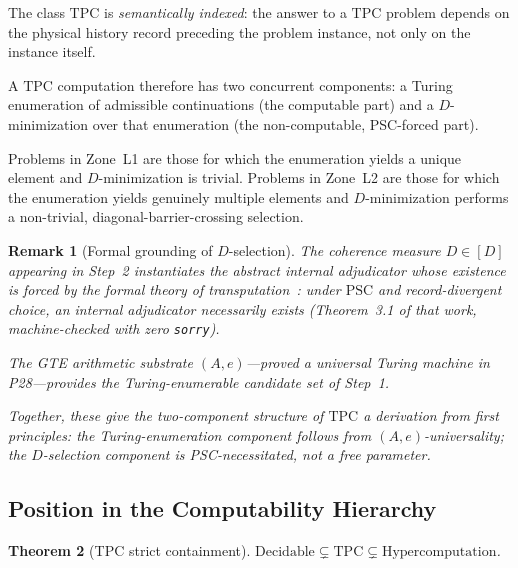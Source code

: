 \documentclass[12pt,letterpaper]{article}
\newtheorem{theorem}{Theorem}[section]
\newtheorem{remark}[theorem]{Remark}
\newcommand{\Dclass}{[D]}
\newcommand{\TPC}{\mathrm{TPC}}
\begin{document}
The class $\TPC$ is \emph{semantically indexed}: the answer to a $\TPC$ problem
depends on the physical history record preceding the problem instance, not only on
the instance itself.

A $\TPC$ computation therefore has two concurrent components: a Turing enumeration of
admissible continuations (the computable part) and a $D$-minimization over that
enumeration (the non-computable, PSC-forced part).

Problems in Zone~L1 are those for which the enumeration yields a unique element and
$D$-minimization is trivial.  Problems in Zone~L2 are those for which the enumeration
yields genuinely multiple elements and $D$-minimization performs a non-trivial,
diagonal-barrier-crossing selection.

\begin{remark}[Formal grounding of $D$-selection]
\label{rem:D-selection-grounding}
The coherence measure $D \in \Dclass$ appearing in Step~2 instantiates the abstract
internal adjudicator whose existence is forced by the formal theory of
transputation~\cite{SpivackNEMS76}: under $\mathrm{PSC}$ and record-divergent choice,
an internal adjudicator necessarily exists (Theorem~3.1 of that work, machine-checked
with zero \texttt{sorry}).

The GTE arithmetic substrate $(A, e)$---proved a universal Turing machine in
P28---provides the Turing-enumerable candidate set of Step~1.

Together, these give the two-component structure of $\TPC$ a derivation from first
principles: the Turing-enumeration component follows from $(A,e)$-universality; the
$D$-selection component is PSC-necessitated, not a free parameter.
\end{remark}

\subsection{Position in the Computability Hierarchy}
\label{sec:tpc-hierarchy}

\begin{theorem}[TPC strict containment]
\label{thm:tpc-strict}
$\mathrm{Decidable} \subsetneq \TPC \subsetneq \mathrm{Hypercomputation}$.
\end{theorem}
\end{document}
